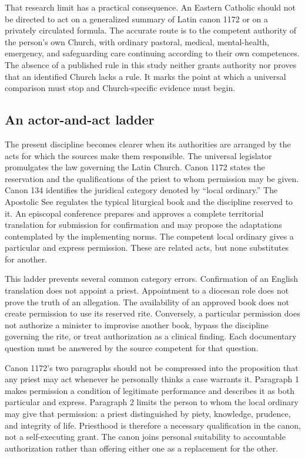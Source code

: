 That research limit has a practical consequence. An Eastern Catholic should
not be directed to act on a generalized summary of Latin canon 1172 or on a
privately circulated formula. The accurate route is to the competent authority
of the person's own Church, with ordinary pastoral, medical, mental-health,
emergency, and safeguarding care continuing according to their own
competences. The absence of a published rule in this study neither grants
authority nor proves that an identified Church lacks a rule. It marks the
point at which a universal comparison must stop and Church-specific evidence
must begin.

\subsection{An actor-and-act ladder}

The present discipline becomes clearer when its authorities are arranged by
the acts for which the sources make them responsible. The universal legislator
promulgates the law governing the Latin Church. Canon 1172 states the
reservation and the qualifications of the priest to whom permission may be
given. Canon 134 identifies the juridical category denoted by ``local
ordinary.'' The Apostolic See regulates the typical liturgical book and the
discipline reserved to it. An episcopal conference prepares and approves a
complete territorial translation for submission for confirmation and may
propose the adaptations contemplated by the implementing norms. The competent
local ordinary gives a particular and express permission. These are related
acts, but none substitutes for another.

This ladder prevents several common category errors. Confirmation of an
English translation does not appoint a priest. Appointment to a diocesan role
does not prove the truth of an allegation. The availability of an approved
book does not create permission to use its reserved rite. Conversely, a
particular permission does not authorize a minister to improvise another
book, bypass the discipline governing the rite, or treat authorization as a
clinical finding. Each documentary question must be answered by the source
competent for that question.

Canon 1172's two paragraphs should not be compressed into the proposition that
any priest may act whenever he personally thinks a case warrants it.
Paragraph 1 makes permission a condition of legitimate performance and
describes it as both particular and express. Paragraph 2 limits the person to
whom the local ordinary may give that permission: a priest distinguished by
piety, knowledge, prudence, and integrity of life. Priesthood is therefore a
necessary qualification in the canon, not a self-executing grant. The canon
joins personal suitability to accountable authorization rather than offering
either one as a replacement for the other.

